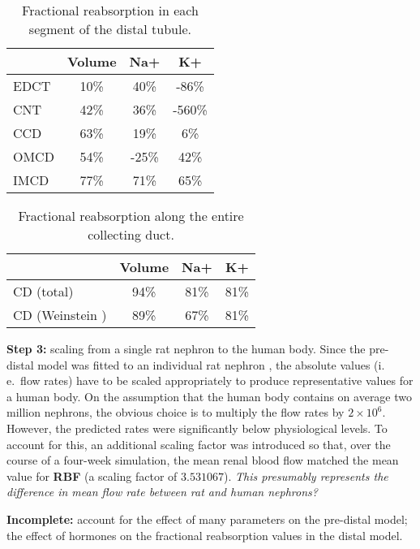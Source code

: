 \documentclass{scrartcl}
\newcommand\ie{i.\,e.\ }
\begin{document}
\begin{table}
  \centering
  \begin{tabularx}{0.6\textwidth}{Xccc}
    \toprule
      & Volume & Na+ & K+ \\
    \midrule
    EDCT \cite{Weinst05} & 10\% & 40\% & -86\% \\
    CNT \cite{Weinst05a} & 42\% & 36\% & -560\% \\
    CCD \cite{Weinst01} & 63\% & 19\% & 6\% \\
    OMCD \cite{Weinst00} & 54\% & -25\% & 42\% \\
    IMCD \cite{Weinst98a} & 77\% & 71\% & 65\% \\
    \bottomrule
  \end{tabularx}
  \caption{Fractional reabsorption in each segment of the distal tubule.}
  \label{tbl:segfrac}
\end{table}

\begin{table}
  \centering
  \begin{tabularx}{0.6\textwidth}{Xccc}
    \toprule
      & Volume & Na+ & K+ \\
    \midrule
    CD (total) & 94\% & 81\% & 81\% \\
    CD (Weinstein \cite{Weinst02b}) & 89\% & 67\% & 81\% \\
    \bottomrule
  \end{tabularx}
  \caption{Fractional reabsorption along the entire collecting duct.}
  \label{tbl:totfrac}
\end{table}

\textbf{Step 3:} scaling from a single rat nephron to the human body. Since the pre-distal model was fitted to an individual rat nephron \cite{Moore94}, the absolute values (\ie flow rates) have to be scaled appropriately to produce representative values for a human body. On the assumption that the human body contains on average two million nephrons, the obvious choice is to multiply the flow rates by $2 \times 10^6$. However, the predicted rates were significantly below physiological levels. To account for this, an additional scaling factor was introduced so that, over the course of a four-week simulation, the mean renal blood flow matched the mean value for \textbf{RBF} (a scaling factor of $3.531067$). \textit{This presumably represents the difference in mean flow rate between rat and human nephrons?}

\textbf{Incomplete:} account for the effect of many parameters on the pre-distal model; the effect of hormones on the fractional reabsorption values in the distal model.
\end{document}
